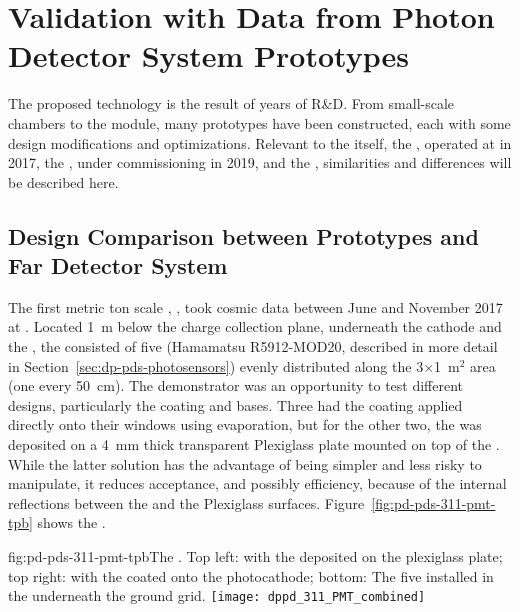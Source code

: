 \section{Validation with Data from Photon Detector System Prototypes}
\label{sec:dp-pds-prototypes}

The    proposed technology is the result of years of R\&D. From small-scale chambers to the  module, many prototypes have been constructed, each with some design modifications and optimizations. 
Relevant to the  itself, the , operated at  in 2017, the , under commissioning in 2019, and the  , similarities and differences will be described here.

\subsection{Design Comparison between Prototypes and Far Detector System}
The first metric ton scale  , , took cosmic data between June and November \num{2017} at . 
Located \SI{1}{m} below the charge collection plane, underneath the cathode and the , the  consisted of five  (Hamamatsu R5912-MOD20, described in more detail in Section~\ref{sec:dp-pds-photosensors}) evenly distributed along the 3$\times$1~m$^2$ area (one  every \SI{50}{cm}). The demonstrator was an opportunity to test different  designs, particularly the  coating and  bases. Three  had the  coating applied directly onto their windows using evaporation, but for the other two, the  was deposited on a \SI{4}{\mm} thick transparent Plexiglass plate mounted on top of the . 
While the latter solution has the advantage of being simpler and less risky to manipulate, it reduces acceptance, and possibly efficiency, because of the internal reflections between the  and the Plexiglass surfaces. 
Figure~\ref{fig:pd-pds-311-pmt-tpb} shows the  .

\begin{dunefigure}{fig:pd-pds-311-pmt-tpb}{The  . Top left:  with the  deposited on the plexiglass plate; top right:  with the  coated onto the photocathode; bottom: The five  installed in the  underneath the ground grid.}
\texttt{[image: dppd\_311\_PMT\_combined]}
\end{dunefigure}

